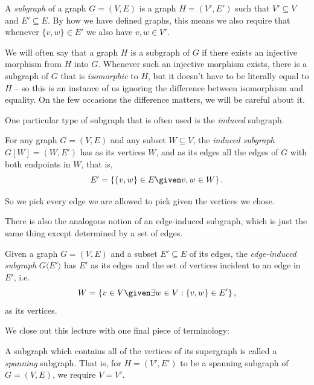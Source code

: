 \documentclass[nobib]{tufte-handout}
\begin{document}
\begin{definition}
  A \emph{subgraph} of a graph $G = (V,E)$ is a graph $H = (V', E')$ such that $V' \subseteq V$ and $E' \subseteq E$. By how we have defined graphs, this means we also require that whenever $\{v,w\} \in E'$ we also have $v, w \in V'$.

  We will often say that a graph $H$ is a subgraph of $G$ if there exists an injective morphism from $H$ into $G$. Whenever such an injective morphism exists, there is a subgraph of $G$ that is \emph{isomorphic} to $H$, but it doesn't have to be literally equal to $H$ -- so this is an instance of us ignoring the difference between isomorphism and equality. On the few occasions the difference matters, we will be careful about it.
\end{definition}

One particular type of subgraph that is often used is the \emph{induced} subgraph.

\begin{definition}
  For any graph $G = (V, E)$ and any subset $W \subseteq V$, the \emph{induced subgraph} $G[W] = (W, E')$ has as its vertices $W$, and as its edges all the edges of $G$ with both endpoints in $W$, that is,
  $$E' = \left\{\{v, w\} \in E \given v, w \in W\right\}.$$

  So we pick every edge we are allowed to pick given the vertices we chose.
\end{definition}

There is also the analogous notion of an edge-induced subgraph, which is just the same thing except determined by a set of edges.

\begin{definition}
  Given a graph $G = (V, E)$ and a subset $E' \subseteq E$ of its edges, the \emph{edge-induced subgraph} $G\langle E' \rangle$ has $E'$ as its edges and the set of vertices incident to an edge in $E'$, i.e.
  $$W = \left\{v \in V \given \exists w \in V: \{v, w\} \in E'\right\},$$
  as its vertices.
\end{definition}

We close out this lecture with one final piece of terminology:

\begin{definition}
  A subgraph which contains all of the vertices of its supergraph is called a \emph{spanning} subgraph. That is, for $H = (V',E')$ to be a spanning subgraph of $G = (V,E)$, we require $V = V'$.
\end{definition}
\end{document}
